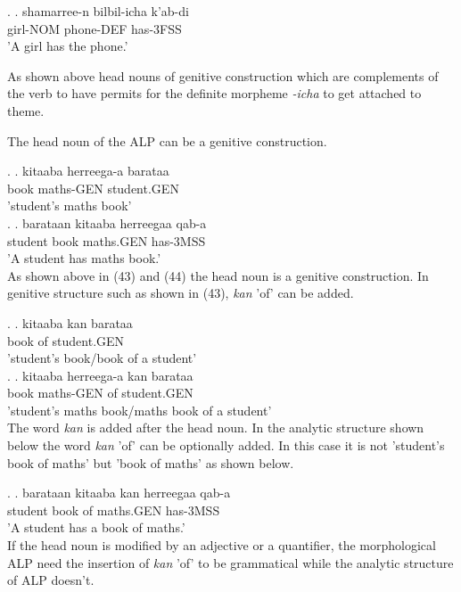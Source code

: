 \documentclass[11pt,a4paper]{article}
\begin{document}
	\ex.
	\ag.
	shamarree-n bilbil-icha k'ab-di\\
	girl-NOM phone-DEF has-3FSS\\
	'A girl has the phone.'
	
	As shown above head nouns of genitive construction which are complements of the verb to have permits  for the definite morpheme \emph{-icha} to get attached to theme.
	
	
	The head noun of the ALP can be a genitive construction. 
	
	\ex.
	\ag.
	kitaaba herreega-a barataa\\
	book maths-GEN student.GEN\\
	'student's maths book'\\

	\ex.
	\ag.
	barataan kitaaba herreegaa qab-a\\
	student book  maths.GEN has-3MSS\\
	'A student has maths book.'\\
	
	As shown above  in (43) and (44) the head noun is a genitive construction. In genitive structure such as shown in (43), \emph{kan} 'of' can be added. 
	
	\ex.
	\ag.
	kitaaba kan barataa\\
	book of student.GEN\\
	'student's book/book of a student'\\
	
	\ex.
	\ag.
	kitaaba herreega-a kan barataa\\
	book maths-GEN of student.GEN\\
	'student's maths book/maths book of a student'\\
	
	
	
	The word \emph{kan} is added after the head noun. In the analytic structure shown below the word \emph{kan} 'of' can be optionally added. In this case it is not 'student's book of maths' but 'book of maths' as shown below.
	
	\ex.
	\ag.
	barataan kitaaba kan herreegaa qab-a\\
	student book  of maths.GEN has-3MSS\\
	'A student has a book of maths.'\\
	
	If the head noun is modified by an adjective or a quantifier, the morphological ALP need the insertion of \emph{kan} 'of' to be grammatical while the analytic structure of ALP doesn't. 
	
\end{document}
